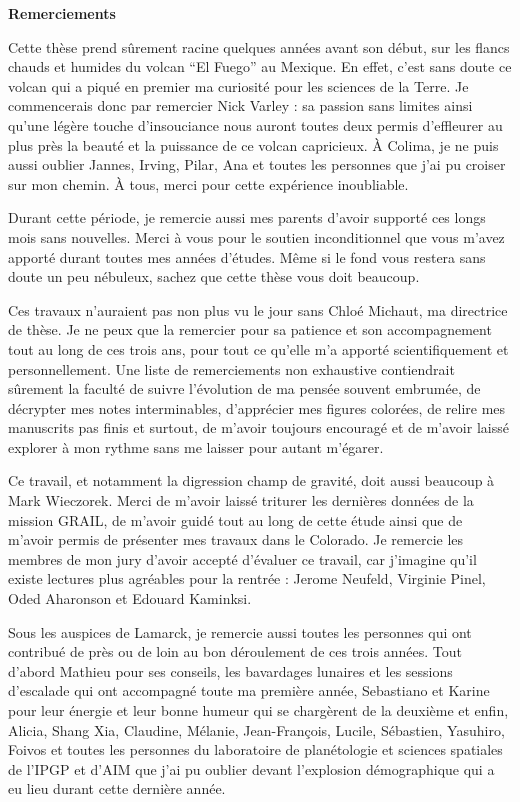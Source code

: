 \thispagestyle{plain}
\begin{flushleft}
 \Large
 \vspace{.5cm}
 \textbf{Remerciements}
\end{flushleft}

Cette thèse prend sûrement racine quelques années avant son début, sur
les flancs chauds et humides du volcan ``El Fuego'' au Mexique. En
effet, c’est sans doute ce volcan qui a piqué en premier ma curiosité
pour les sciences de la Terre. Je commencerais donc par remercier Nick
Varley : sa passion sans limites ainsi qu’une légère touche
d’insouciance nous auront toutes deux permis d’effleurer au plus près
la beauté et la puissance de ce volcan capricieux. À Colima, je ne
puis aussi oublier Jannes, Irving, Pilar, Ana et toutes les personnes
que j’ai pu croiser sur mon chemin. À tous, merci pour cette
expérience inoubliable.

Durant cette période, je remercie aussi mes parents d’avoir supporté
ces longs mois sans nouvelles. Merci à vous pour le soutien
inconditionnel que vous m’avez apporté durant toutes mes années
d’études. Même si le fond vous restera sans doute un peu nébuleux,
sachez que cette thèse vous doit beaucoup.

Ces travaux n’auraient pas non plus vu le jour sans Chloé Michaut, ma
directrice de thèse. Je ne peux que la remercier pour sa patience et
son accompagnement tout au long de ces trois ans, pour tout ce qu’elle
m’a apporté scientifiquement et personnellement. Une liste de
remerciements non exhaustive contiendrait sûrement la faculté de suivre
l’évolution de ma pensée souvent embrumée, de décrypter mes notes
interminables, d’apprécier mes figures colorées, de relire mes
manuscrits pas finis et surtout, de m’avoir toujours encouragé et de
m’avoir laissé explorer à mon rythme sans me laisser pour autant
m’égarer.

Ce travail,  et notamment la  digression champ de gravité,  doit aussi
beaucoup  à  Mark Wieczorek.  Merci  de  m’avoir laissé  triturer  les
dernières données de  la mission GRAIL, de m’avoir guidé  tout au long
de cette  étude ainsi que de  m’avoir permis de présenter  mes travaux
dans le Colorado. Je remercie les  membres de mon jury d’avoir accepté
d’évaluer  ce  travail,  car  j’imagine  qu’il  existe  lectures  plus
agréables  pour la  rentrée  : Jerome  Neufeld,  Virginie Pinel,  Oded
Aharonson et Edouard Kaminksi.

Sous les auspices  de Lamarck, je remercie aussi  toutes les personnes
qui ont contribué de  près ou de loin au bon  déroulement de ces trois
années.   Tout  d’abord  Mathieu  pour ses  conseils,  les  bavardages
lunaires  et  les sessions  d’escalade  qui  ont accompagné  toute  ma
première année, Sebastiano  et Karine pour leur énergie  et leur bonne
humeur qui se  chargèrent de la deuxième et enfin,  Alicia, Shang Xia,
Claudine, Mélanie, Jean-François,  Lucile, Sébastien, Yasuhiro, Foivos
et toutes  les personnes  du laboratoire  de planétologie  et sciences
spatiales de  l’IPGP et d'AIM  que j’ai pu oublier  devant l’explosion
démographique qui a eu lieu durant cette dernière année.

